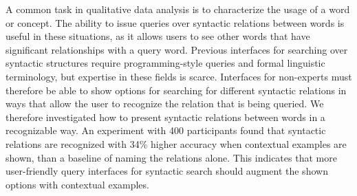 
A common task in qualitative data analysis is to characterize the usage of a word or concept. The ability to issue queries over syntactic relations between words is useful in these situations, as it allows users to see other words that have significant relationships with a query word. Previous interfaces for  searching over syntactic structures require programming-style queries and formal linguistic terminology, but expertise in these fields is scarce. Interfaces for non-experts must therefore be able to show options for searching for different syntactic relations in ways that allow the user to recognize the relation that is being queried. We therefore investigated how to present syntactic relations between words in a recognizable way. An experiment with 400 participants found that syntactic relations are recognized with 34\% higher accuracy when contextual examples are shown, than a baseline of naming the relations alone.  This indicates that more user-friendly query interfaces for syntactic search should augment the shown options with contextual examples.
